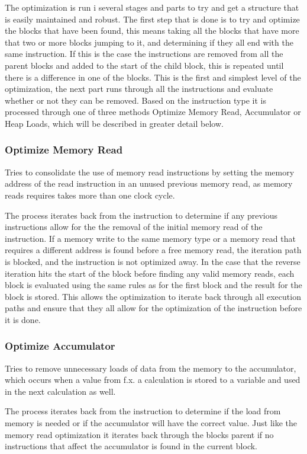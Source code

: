 The optimization is run i several stages and parts to try and get a structure that is easily maintained and robust. The first step that is done is to try and optimize the blocks that have been found, this means taking all the blocks that have more that two or more blocks jumping to it, and determining if they all end with the same instruction. If this is the case the instructions are removed from all the parent blocks and added to the start of the child block, this is repeated until there is a difference in one of the blocks. This is the first and simplest level of the optimization, the next part runs through all the instructions and evaluate whether or not they can be removed. Based on the instruction type it is processed through one of three methods Optimize Memory Read, Accumulator or Heap Loads, which will be described in greater detail below.

\subsubsection{Optimize Memory Read}
Tries to consolidate the use of memory read instructions by setting the memory address of the read instruction in an unused previous memory read, as memory reads requires takes more than one clock cycle. 

The process iterates back from the instruction to determine if any previous instructions allow for the the removal of the initial memory read of the instruction. If a memory write to the same memory type or a memory read that requires a different address is found before a free memory read, the iteration path is blocked, and the instruction is not optimized away. In the case that the reverse iteration hits the start of the block before finding any valid memory reads, each block is evaluated using the same rules as for the first block and the result for the block is stored. This allows the optimization to iterate back through all execution paths and ensure that they all allow for the optimization of the instruction before it is done.

\subsubsection{Optimize Accumulator}
Tries to remove unnecessary loads of data from the memory to the accumulator, which occurs when a value from f.x. a calculation is stored to a variable and used in the next calculation as well. 

The process iterates back from the instruction to determine if the load from memory is needed or if the accumulator will have the correct value. Just like the memory read optimization it iterates back through the blocks parent if no instructions that affect the accumulator is found in the current block.

